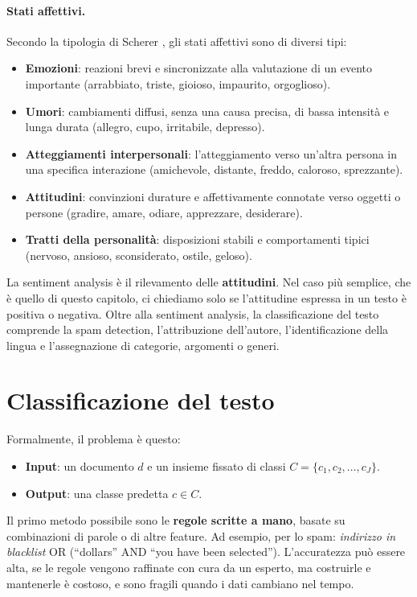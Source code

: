 \paragraph{Stati affettivi.} Secondo la tipologia di Scherer \cite{scherer2000}, gli stati affettivi sono di diversi tipi:
\begin{itemize}
    \item \textbf{Emozioni}: reazioni brevi e sincronizzate alla valutazione di un evento importante (arrabbiato, triste, gioioso, impaurito, orgoglioso).
    \item \textbf{Umori}: cambiamenti diffusi, senza una causa precisa, di bassa intensità e lunga durata (allegro, cupo, irritabile, depresso).
    \item \textbf{Atteggiamenti interpersonali}: l'atteggiamento verso un'altra persona in una specifica interazione (amichevole, distante, freddo, caloroso, sprezzante).
    \item \textbf{Attitudini}: convinzioni durature e affettivamente connotate verso oggetti o persone (gradire, amare, odiare, apprezzare, desiderare).
    \item \textbf{Tratti della personalità}: disposizioni stabili e comportamenti tipici (nervoso, ansioso, sconsiderato, ostile, geloso).
\end{itemize}
La sentiment analysis è il rilevamento delle \textbf{attitudini}. Nel caso più semplice, che è quello di questo capitolo, ci chiediamo solo se l'attitudine espressa in un testo è positiva o negativa. Oltre alla sentiment analysis, la classificazione del testo comprende la spam detection, l'attribuzione dell'autore, l'identificazione della lingua e l'assegnazione di categorie, argomenti o generi.

\section{Classificazione del testo}
Formalmente, il problema è questo:
\begin{itemize}
    \item \textbf{Input}: un documento $d$ e un insieme fissato di classi $C = \{c_1, c_2, \dots, c_J\}$.
    \item \textbf{Output}: una classe predetta $c \in C$.
\end{itemize}
Il primo metodo possibile sono le \textbf{regole scritte a mano}, basate su combinazioni di parole o di altre feature. Ad esempio, per lo spam: \textit{indirizzo in blacklist} OR (\enquote{dollars} AND \enquote{you have been selected}). L'accuratezza può essere alta, se le regole vengono raffinate con cura da un esperto, ma costruirle e mantenerle è costoso, e sono fragili quando i dati cambiano nel tempo.

